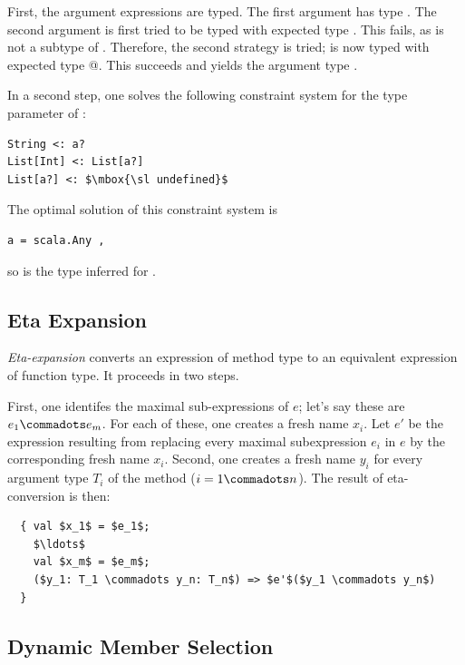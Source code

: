 First, the argument expressions are typed. The first argument
 has type . The second argument  is
first tried to be typed with expected type . This fails,
as  is not a subtype of . Therefore, 
the second strategy is tried;  is now typed with expected type
@. This succeeds and yields the argument type
.

In a second step, one solves the following constraint system for
the type parameter  of :
\begin{lstlisting}
String <: a?
List[Int] <: List[a?]
List[a?] <: $\mbox{\sl undefined}$
\end{lstlisting}
The optimal solution of this constraint system is
\begin{lstlisting}
a = scala.Any ,
\end{lstlisting}
so  is the type inferred for .

\subsection{Eta Expansion}\label{sec:eta-expand}

  {\em Eta-expansion} converts an expression of method type to an
  equivalent expression of function type. It proceeds in two steps.

  First, one identifes the maximal sub-expressions of $e$; let's
  say these are $e_1 \commadots e_m$. For each of these, one creates a
  fresh name $x_i$. Let $e'$ be the expression resulting from
  replacing every maximal subexpression $e_i$ in $e$ by the
  corresponding fresh name $x_i$. Second, one creates a fresh name $y_i$
  for every argument type $T_i$ of the method ($i = 1 \commadots
  n$). The result of eta-conversion is then:
\begin{lstlisting}
  { val $x_1$ = $e_1$; 
    $\ldots$ 
    val $x_m$ = $e_m$; 
    ($y_1: T_1 \commadots y_n: T_n$) => $e'$($y_1 \commadots y_n$) 
  }
\end{lstlisting}

\subsection{Dynamic Member Selection}\label{sec:dyn-mem-sel}

